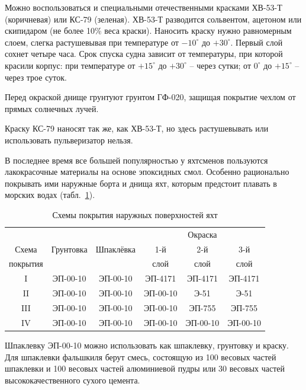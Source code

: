 \documentclass[a4paper, 12pt, twoside, final]{scrbook}
\begin{document}
Можно воспользоваться и специальными отечественными красками ХВ-53-Т (коричневая) или КС-79 (зеленая). ХВ-53-Т разводится сольвентом, ацетоном или скипидаром (не более 10\% веса краски). Наносить краску нужно равномерным слоем, слегка растушевывая при температуре от $-10^\circ$ до $+30^\circ$. Первый слой сохнет четыре часа. Срок спуска судна зависит от температуры, при которой красили корпус: при температуре от $+15^\circ$ до $+30^\circ$ \--- через сутки; от $0^\circ$ до $+15^\circ$ \--- через трое суток.

Перед окраской днище грунтуют грунтом ГФ-020, защищая покрытие чехлом от прямых солнечных лучей.

Краску КС-79 наносят так же, как ХВ-53-Т, но здесь растушевывать или использовать пульверизатор нельзя.

В последнее время все большей популярностью у яхтсменов пользуются лакокрасочные материалы на основе эпоксидных смол. Особенно рационально покрывать ими наружные борта и днища яхт, которым предстоит плавать в морских водах (табл.~\ref{tab:2}).

\begin{table}[ht]
   \centering
   \begin{tabular}{@{} cccccc @{}} %
      \toprule
      & & & \multicolumn{3}{c}{Окраска} \\
      \cmidrule(r){4-6} %
      Схема    & Грунтовка & Шпаклёвка & 1-й  & 2-й  & 3-й  \\
      покрытия &           &           & слой & слой & слой \\
      \midrule
      I   & ЭП-00-10 & ЭП-00-10 & ЭП-4171  & ЭП-4171  & ЭП-4171  \\
      II  & ЭП-00-10 & ЭП-00-10 & ЭП-00-10 & Э-51     & Э-51     \\
      III & ЭП-00-10 & ЭП-00-10 & ЭП-00-10 & ЭП-755   & ЭП-755   \\
      IV  & ЭП-00-10 & ЭП-00-10 & ЭП-00-10 & ЭП-00-10 & ЭП-00-10 \\
      \bottomrule
   \end{tabular}
   \caption{Схемы покрытия наружных поверхностей яхт}
   \label{tab:2}
\end{table}

Шпаклевку ЭП-00-10 можно использовать как шпаклевку, грунтовку и краску. Для шпаклевки фальшкиля берут смесь, состоящую из 100 весовых частей шпаклевки и 100 весовых частей алюминиевой пудры или 30 весовых частей высококачественного сухого цемента.
\end{document}
